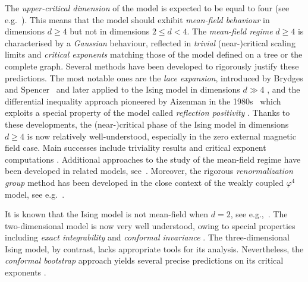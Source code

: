 \documentclass[10pt,a4paper]{amsart}
\numberwithin{equation}{section}
\begin{document}
The \emph{upper-critical dimension} of the model is expected to be equal to four (see e.g.~\cite{WilsonFisher1972dcexpansion}). This means that the model should exhibit \emph{mean-field behaviour} in dimensions $d\geq 4$ but not in dimensions $2\leq d<4$.
The \emph{mean-field regime} $d\geq 4$ is characterised by a \emph{Gaussian} 
behaviour, reflected in \emph{trivial} (near-)critical scaling limits 
and \emph{critical exponents} matching those of the model defined on a 
tree or the complete graph. Several methods have been developed to rigorously justify these 
predictions. The most notable ones are the \emph{lace expansion}, 
introduced by Brydges and Spencer~\cite{BrydgesSpencerSAW} and later 
applied to the Ising model in dimensions $d\gg 4$ 
\cite{Sakai2007LaceExpIsing,Sakai2022correctboundsIsing}, and the 
differential inequality approach pioneered by Aizenman in the 
1980s~\cite{AizenmanGeometricAnalysis1982} which exploits a special 
property of the model called \emph{reflection positivity} \cite{FrohlichSimonSpencerIRBounds1976,FrohlichIsraelLiebSimon1978}.  Thanks to these developments, the (near-)critical phase of the Ising model in dimensions $d\geq 4$ is now relatively well-understood, especially in the zero external magnetic field case. Main successes include triviality results \cite{AizenmanGeometricAnalysis1982,FrohlichTriviality1982,AizenmanDuminilTriviality2021,PanisTriviality2023} and critical exponent computations \cite{AizenmanFernandezCriticalBehaviorMagnetization1986,AizenmanBarskyFernandezSharpnessIsing1987,AizenmanGeometricAnalysis1982,FrohlichTriviality1982,DuminilPanis2024newLB,vEGPS,AizenmanGrahamRenormalizedCouplingSusceptibility4d1983,Sakai2007LaceExpIsing}.
Additional approaches to the study of the mean-field regime have been developed in related models, 
see~\cite{DumPan24WSAW,DumPan24Perco,duminil2026random,hutchcroft2025criticalI,hutchcroft2025criticalIII}. Moreover, the rigorous \emph{renormalization group} method has been developed in the close context of the weakly coupled $\varphi^4$ model, see e.g.~\cite{gawedzki1985massless,BBS19,SladeTombergRGWeakPhi4in2016,BauerschmidtBrydgesSlade2014Phi4fourdim,lohmann2020critical,park2025renormalisation,bauerschmidt2017finite}.


It is known that the Ising model is not mean-field when $d=2$, 
see e.g.,~\cite{AizenmanGeometricAnalysis1982,camia2016planar}. The
two-dimensional model is now very well understood, owing to special properties 
including \emph{exact integrability} 
\cite{Onsager1944,Yang1952spontaneous,McCoyWu1973two} and 
\emph{conformal invariance} 
\cite{SmirnovConformalInvarianceIsing,ChelkakHonglerIz2015conformal,ChelkakDCHonglerKempSmir2014CV}. 
The three-dimensional Ising model, by contrast, lacks appropriate tools for its analysis. Nevertheless, the \emph{conformal bootstrap} approach yields 
several precise predictions on its critical exponents 
\cite{RychkovNonGaussianity2017,ElShowkRychkov2012ConfBootstrapI,ElShowkRychkov2014ConfBootstrapII}.
\end{document}
